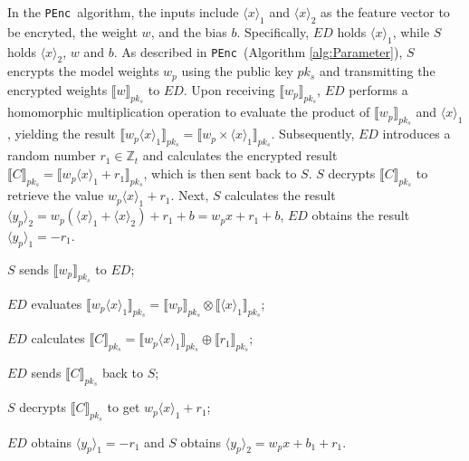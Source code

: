 \documentclass[conference]{IEEEtran}
\newcommand{\PEnc}{\texttt{PEnc}}
\begin{document}
In the \PEnc~algorithm, the inputs include $\langle x\rangle_1$ and $\langle x\rangle_2$ as the feature vector to be encryted, the weight $w$, and the bias $b$. Specifically, $ED$ holds $\langle x\rangle_1$, while $S$ holds $\langle x\rangle_2$, $w$ and $b$. As described in \PEnc~(Algorithm \ref{alg:Parameter}), $S$ encrypts the model weights $w_p$ using the public key $pk_s$ and transmitting the encrypted weights $\llbracket w \rrbracket_{pk_s}$ to $ED$. Upon receiving $\llbracket w_p \rrbracket_{pk_s}$, $ED$ performs a homomorphic multiplication operation to evaluate the product of $\llbracket w_p \rrbracket_{pk_s}$ and $\langle x \rangle_1$, yielding the result $\llbracket w_p \langle x \rangle_1\rrbracket_{pk_s} = \llbracket w_p \times \langle x \rangle_1 \rrbracket_{pk_s}$. Subsequently, $ED$ introduces a random number $r_1\in \mathbb{Z}_t$ and calculates the encrypted result $\llbracket C \rrbracket_{pk_s}=\llbracket w_p \langle x \rangle_1 + r_1 \rrbracket_{pk_s}$, which is then sent back to $S$. $S$ decrypts $\llbracket C \rrbracket_{pk_s}$ to retrieve the value $w_p\langle x \rangle_1+r_1$. Next, $S$ calculates the result $\langle y_p\rangle_2= w_p(\langle x \rangle_1 + \langle x \rangle_2)+r_1+b=w_px+r_1+b$, $ED$ obtains the result $\langle y_p\rangle_1=-r_1$. 
\begin{algorithm}[htbp]
	\caption{\PEnc$(\langle x \rangle_1,\langle x \rangle_2,w,b) \rightarrow (\langle y_p\rangle_1, \langle y_p\rangle_2)$}
    \label{alg:Parameter}
    \LinesNumbered
     $S$ sends $\llbracket w_p\rrbracket_{pk_s}$ to $ED$;
    
     $ED$ evaluates $\llbracket w_p\langle x \rangle_1 \rrbracket_{pk_s} = \llbracket w_p \rrbracket_{pk_s} \otimes \llbracket \langle x \rangle_1 \rrbracket_{pk_s}$;
    
     $ED$  calculates $\llbracket C\rrbracket_{pk_s} = \llbracket w_p\langle x \rangle_1 \rrbracket_{pk_s} \oplus \llbracket r_1 \rrbracket_{pk_s}$;
     
     $ED$ sends $\llbracket C\rrbracket_{pk_s}$ back to $S$;
    
     $S$ decrypts $\llbracket C\rrbracket_{pk_s}$ to get $w_p\langle x \rangle_1 + r_1$;
     
     $ED$ obtains $\langle y_p\rangle_1=-r_1$ and $S$ obtains $\langle y_p\rangle_2 = w_p x  + b_1 + r_1$.
\end{algorithm}
\end{document}
